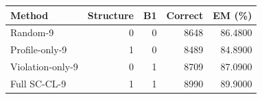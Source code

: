 \begin{tabular}{lrrrr}
\toprule
Method & Structure & B1 & Correct & EM (\%) \\
\midrule
Random-9 & 0 & 0 & 8648 & 86.4800 \\
Profile-only-9 & 1 & 0 & 8489 & 84.8900 \\
Violation-only-9 & 0 & 1 & 8709 & 87.0900 \\
Full SC-CL-9 & 1 & 1 & 8990 & 89.9000 \\
\bottomrule
\end{tabular}
